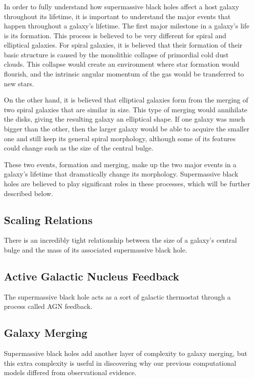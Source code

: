 \documentclass[12pt]{article}
\begin{document}
    \subsubsection*{}
    \vspace{-5mm}
    In order to fully understand how supermassive black holes affect a host
    galaxy throughout its lifetime, it is important to understand the major
    events that happen throughout a galaxy's lifetime.  The first major
    milestone in a galaxy's life is its formation.  This process is believed to
    be very different for spiral and elliptical galaxies.  For spiral galaxies,
    it is believed that their formation of their basic structure is caused by
    the monolithic collapse of primordial cold dust clouds.  This collapse would
    create an environment where star formation would flourish, and the intrinsic
    angular momentum of the gas would be transferred to new stars.

    On the other
    hand, it is believed that elliptical galaxies form from the merging of two
    spiral galaxies that are similar in size.  This type of merging would
    annihilate the disks, giving the resulting galaxy an elliptical shape.  If
    one galaxy was much bigger than the other, then the larger galaxy would be
    able to acquire the smaller one and still keep its general spiral
    morphology, although some of its features could change such as the size of
    the central bulge.

    These two events, formation and merging, make up the two major events in a
    galaxy's lifetime that dramatically change its morphology.  Supermassive
    black holes are believed to play significant roles in these processes, which
    will be further described below.


\subsection*{\bf Scaling Relations}
There is an incredibly tight relationship between the size of a galaxy's central
bulge and the mass of its associated supermassive black hole.

\subsection*{\bf Active Galactic Nucleus Feedback}
The supermassive black hole acts as a sort of galactic thermostat through a
process called AGN feedback.

\subsection *{\bf Galaxy Merging}
Supermassive black holes add another layer of complexity to galaxy merging, but
this extra complexity is useful in discovering why our previous computational
models differed from observational evidence.
\end{document}
